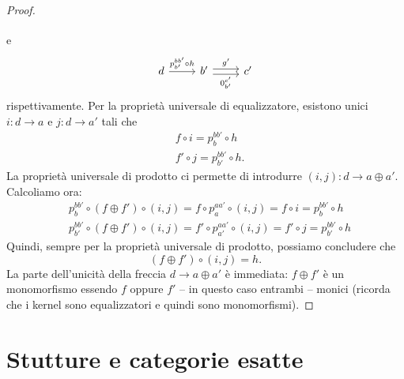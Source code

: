 \begin{proof}
\[\begin{tikzcd}
    \end{tikzcd}
  \]
  e
  \[
    \begin{tikzcd}
      d \ar["{p_{b'}^{bb'} \circ h}", r] & b' \ar["{g'}", r, shift left]
      \ar["{0_{b'}^{c'}}", r, shift right, swap] & c'
    \end{tikzcd}
  \]
  rispettivamente. Per la proprietà universale di equalizzatore,
  esistono unici \(i : d \to a\) e \(j : d \to a'\) tali che
  \begin{align*}
    & f \circ i = p_b^{bb'} \circ h \\
    & f' \circ j = p_{b'}^{bb'} \circ h .
  \end{align*}
  La proprietà universale di prodotto ci permette di introdurre
  \((i,j) : d \to a \oplus a'\).  Calcoliamo ora:
  \begin{align*}
    & p_b^{bb'} \circ (f \oplus f') \circ (i,j) = f \circ p_a^{aa'} \circ (i,j) = f \circ i = p_b^{bb'} \circ h \\
    & p_{b'}^{bb'} \circ (f \oplus f') \circ (i,j) = f' \circ p_{a'}^{aa'} \circ (i,j) = f' \circ j = p_{b'}^{bb'} \circ h
  \end{align*}
  Quindi, sempre per la proprietà universale di prodotto, possiamo
  concludere che
  \[
    (f \oplus f') \circ (i,j) = h.
  \]
  La parte dell'unicità della freccia \(d \to a \oplus a'\) è immediata: \(f
  \oplus f'\) è un monomorfismo essendo \(f\) oppure \(f'\) -- in questo
  caso entrambi -- monici (ricorda che i kernel sono equalizzatori e
  quindi sono monomorfismi).
\end{proof}



\section{Stutture e categorie esatte}


